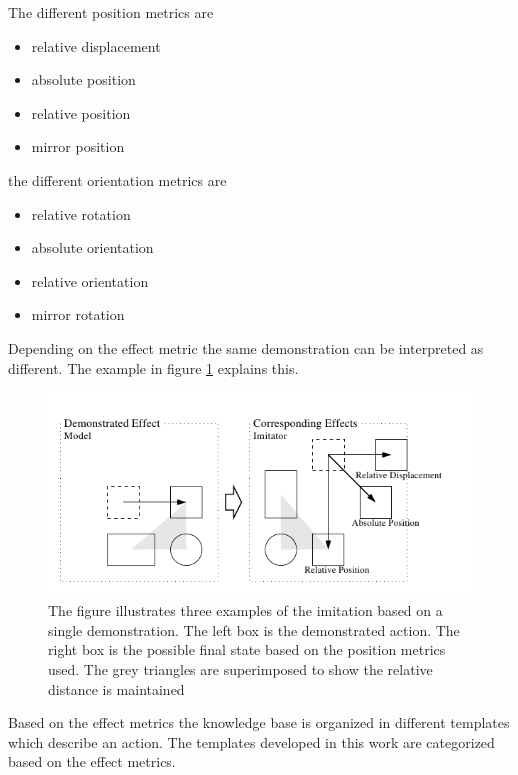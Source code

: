 The different position metrics are 
\begin{itemize}
	\item relative displacement
	\item absolute position
	\item relative position
	\item mirror position
\end{itemize}

the different orientation metrics are 
\begin{itemize}
	\item relative rotation
	\item absolute orientation
	\item relative orientation
	\item mirror rotation
\end{itemize}

Depending on the effect metric the same demonstration can be interpreted as different. 
The example in figure \ref{effect metrics} explains this.
\begin{figure}[htp]
\centering
\includegraphics[scale=0.8]{images/effect_position.png}
\caption[Effect metrics in imitation]{The figure illustrates three examples
 of the imitation based on a single demonstration. The left box is the
 demonstrated action. The right box is the possible final state based on
 the position metrics used. The grey triangles are superimposed to show
 the relative distance is maintained \cite{alissandrakis_action_2006}}
\label{effect metrics}
\end{figure}

Based on the effect metrics the knowledge base is organized in different templates which describe an action.
The templates developed in this work are categorized based on the effect metrics.

